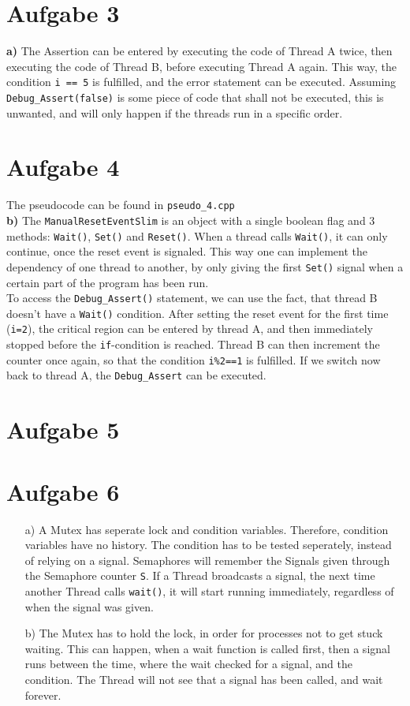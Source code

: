 \documentclass{article}
\begin{document}
\section*{Aufgabe 3}
\textbf{a)} The Assertion can be entered by executing the code of Thread A
twice, then executing the code of Thread B, before executing Thread A again.
This way, the condition \texttt{i == 5} is fulfilled, and the error
statement can be executed. Assuming \texttt{Debug\_Assert(false)} is some
piece of code that shall not be executed, this is unwanted, and will only
happen if the threads run in a specific order.	\section*{Aufgabe 4}
The pseudocode can be found in \texttt{pseudo\_4.cpp} \\
\textbf{b)} The \texttt{ManualResetEventSlim} is an object with a single boolean
flag and 3 methods: \texttt{Wait()}, \texttt{Set()} and \texttt{Reset()}.
When a thread calls \texttt{Wait()}, it can only continue, once the reset event
is signaled. This way one can implement the dependency of one thread to another,
by only giving the first \texttt{Set()} signal when a certain part of the program
has been run. \\
To access the \texttt{Debug\_Assert()} statement, we can use the fact, that thread
B doesn't have a \texttt{Wait()} condition. After setting the reset event for the
first time (\texttt{i=2}), the critical region can be entered by thread A,
and then immediately stopped before the \texttt{if}-condition is reached. Thread
B can then increment the counter once again, so that the condition \texttt{i\%2==1}
is fulfilled. If we switch now back to thread A, the \texttt{Debug\_Assert} can be
executed.
\section*{Aufgabe 5}
\section*{Aufgabe 6}
\begin{itemize}
    \item[a)]
	A Mutex has seperate lock and condition variables. Therefore, condition
	variables have no history. The condition has to be tested seperately,
	instead of relying on a signal.
	Semaphores will remember the Signals given through the Semaphore counter
	\verb=S=. If a Thread broadcasts a signal, the next time another Thread
	calls \verb=wait()=, it will start running immediately, regardless
	of when the signal was given.
    \item[b)]
	The Mutex has to hold the lock, in order for processes not to get stuck
	waiting. This can happen, when a wait function is called first, then a
	signal runs between the time, where the wait checked for a signal, and
	the condition. The Thread will not see that a signal has been called,
	and wait forever.
\end{itemize}
\end{document}
